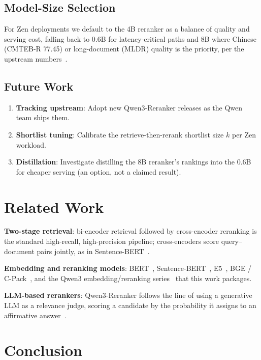 \documentclass[11pt,letterpaper]{article}
\begin{document}
\subsection{Model-Size Selection}

For Zen deployments we default to the 4B reranker as a balance of quality and serving cost,
falling back to 0.6B for latency-critical paths and 8B where Chinese (CMTEB-R 77.45) or
long-document (MLDR) quality is the priority, per the upstream numbers~\cite{qwen3embedding}.

\subsection{Future Work}

\begin{enumerate}
    \item \textbf{Tracking upstream}: Adopt new Qwen3-Reranker releases as the Qwen team ships them.
    \item \textbf{Shortlist tuning}: Calibrate the retrieve-then-rerank shortlist size $k$ per Zen workload.
    \item \textbf{Distillation}: Investigate distilling the 8B reranker's rankings into the 0.6B for cheaper serving (an option, not a claimed result).
\end{enumerate}

\section{Related Work}

\textbf{Two-stage retrieval}: bi-encoder retrieval followed by cross-encoder reranking is the
standard high-recall, high-precision pipeline; cross-encoders score query--document pairs
jointly, as in Sentence-BERT~\cite{reimers2019sentence}.

\textbf{Embedding and reranking models}: BERT~\cite{devlin2018bert},
Sentence-BERT~\cite{reimers2019sentence}, E5~\cite{wang2022text}, BGE / C-Pack~\cite{xiao2023c},
and the Qwen3 embedding/reranking series~\cite{qwen3embedding} that this work packages.

\textbf{LLM-based rerankers}: Qwen3-Reranker follows the line of using a generative LLM as a
relevance judge, scoring a candidate by the probability it assigns to an affirmative
answer~\cite{qwen3embedding}.

\section{Conclusion}
\end{document}
